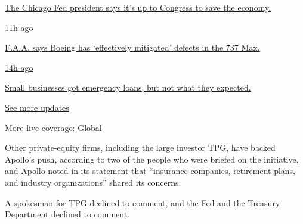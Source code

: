 \href{https://www.nytimes3xbfgragh.onion/live/2020/08/03/business/stock-market-today-coronavirus?action=click\&pgtype=Article\&state=default\&region=MAIN_CONTENT_1\&context=storylines_live_updates\#the-chicago-fed-president-says-its-up-to-congress-to-save-the-economy}{The
Chicago Fed president says it's up to Congress to save the economy.}

\href{https://www.nytimes3xbfgragh.onion/live/2020/08/03/business/stock-market-today-coronavirus?action=click\&pgtype=Article\&state=default\&region=MAIN_CONTENT_1\&context=storylines_live_updates\#faa-says-boeing-has-effectively-mitigated-defects-in-the-737-max}{11h
ago}

\href{https://www.nytimes3xbfgragh.onion/live/2020/08/03/business/stock-market-today-coronavirus?action=click\&pgtype=Article\&state=default\&region=MAIN_CONTENT_1\&context=storylines_live_updates\#faa-says-boeing-has-effectively-mitigated-defects-in-the-737-max}{F.A.A.
says Boeing has `effectively mitigated' defects in the 737 Max.}

\href{https://www.nytimes3xbfgragh.onion/live/2020/08/03/business/stock-market-today-coronavirus?action=click\&pgtype=Article\&state=default\&region=MAIN_CONTENT_1\&context=storylines_live_updates\#small-businesses-got-emergency-loans-but-not-what-they-expected}{14h
ago}

\href{https://www.nytimes3xbfgragh.onion/live/2020/08/03/business/stock-market-today-coronavirus?action=click\&pgtype=Article\&state=default\&region=MAIN_CONTENT_1\&context=storylines_live_updates\#small-businesses-got-emergency-loans-but-not-what-they-expected}{Small
businesses got emergency loans, but not what they expected.}

\href{https://www.nytimes3xbfgragh.onion/live/2020/08/03/business/stock-market-today-coronavirus?action=click\&pgtype=Article\&state=default\&region=MAIN_CONTENT_1\&context=storylines_live_updates}{See
more updates}

More live coverage:
\href{https://www.nytimes3xbfgragh.onion/2020/08/03/world/coronavirus-covid-19.html?action=click\&pgtype=Article\&state=default\&region=MAIN_CONTENT_1\&context=storylines_live_updates}{Global}

Other private-equity firms, including the large investor TPG, have
backed Apollo's push, according to two of the people who were briefed on
the initiative, and Apollo noted in its statement that ``insurance
companies, retirement plans, and industry organizations'' shared its
concerns.

A spokesman for TPG declined to comment, and the Fed and the Treasury
Department declined to comment.

